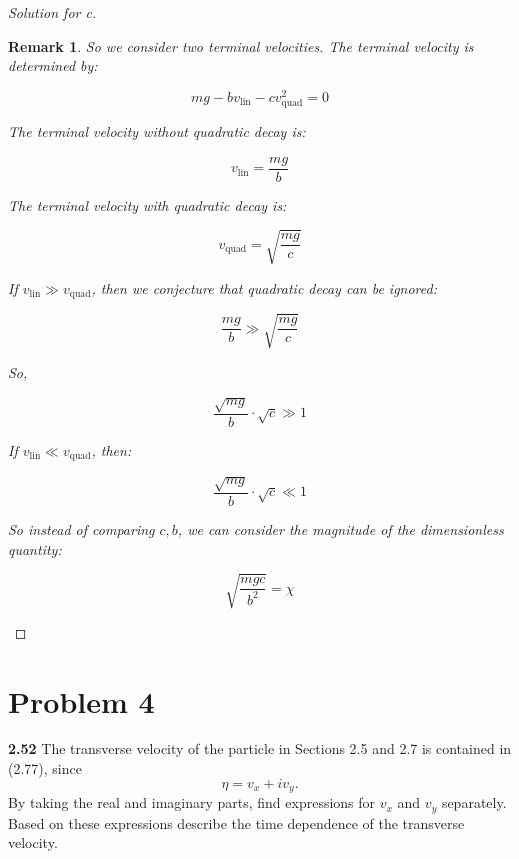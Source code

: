 \documentclass{article}
\numberwithin{equation}{section}
\newtheorem{remark}{Remark}
\begin{document}
\begin{proof}[Solution for c]
    \begin{remark}

So we consider two terminal velocities. The terminal velocity is determined by:

\[
mg - b v_{\text{lin}} - c v_{\text{quad}}^2 = 0
\]

The terminal velocity without quadratic decay is:

\[
v_{\text{lin}} = \frac{mg}{b}
\]

The terminal velocity with quadratic decay is:

\[
v_{\text{quad}} = \sqrt{\frac{mg}{c}}
\]

If \(v_{\text{lin}} \gg v_{\text{quad}}\), then we conjecture that quadratic decay can be ignored:

\[
\frac{mg}{b} \gg \sqrt{\frac{mg}{c}}
\]

So,

\[
\frac{\sqrt{mg}}{b} \cdot \sqrt{c} \gg 1
\]

If \(v_{\text{lin}} \ll v_{\text{quad}}\), then:

\[
\frac{\sqrt{mg}}{b} \cdot \sqrt{c} \ll 1
\]

So instead of comparing \(c, b\), we can consider the magnitude of the dimensionless quantity:

\[
\sqrt{\frac {mgc}{b^2}} = \chi
\]
\end{remark}
\end{proof}

\section{Problem 4}
\textbf{2.52}
The transverse velocity of the particle in Sections 2.5 and 2.7 is contained in (2.77), since 
\[
\eta = v_x + iv_y.
\]
By taking the real and imaginary parts, find expressions for \( v_x \) and \( v_y \) separately. Based on these expressions describe the time dependence of the transverse velocity.
\end{document}
